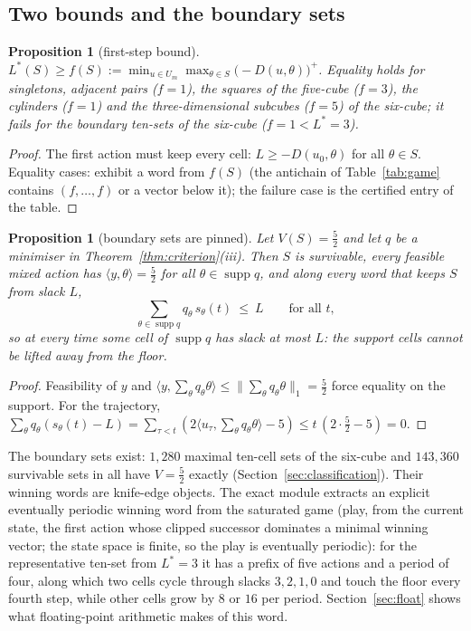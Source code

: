 \documentclass[11pt,a4paper]{article}
\theoremstyle{plain}
\newtheorem{proposition}[theorem]{Proposition}
\theoremstyle{definition}
\theoremstyle{remark}
\newcommand{\supp}{\operatorname{supp}}
\newcommand{\tfr}[2]{\tfrac{#1}{#2}}
\newcommand{\Lstar}{L^{\ast}}
\begin{document}
\subsection{Two bounds and the boundary sets}
\begin{proposition}[first-step bound]\label{prop:firststep}
$\Lstar(S)\ge f(S):=\min_{u\in U_m}\max_{\theta\in S}\big(-D(u,\theta)\big)^+$. Equality holds for singletons, adjacent pairs ($f=1$), the squares of the five-cube ($f=3$), the cylinders ($f=1$) and the three-dimensional subcubes ($f=5$) of the six-cube; it fails for the boundary ten-sets of the six-cube ($f=1<\Lstar=3$).
\end{proposition}
\begin{proof}
The first action must keep every cell: $L\ge-D(u_0,\theta)$ for all $\theta\in S$. Equality cases: exhibit a word from $f(S)$ (the antichain of Table~\ref{tab:game} contains $(f,\dots,f)$ or a vector below it); the failure case is the certified entry of the table.
\end{proof}

\begin{proposition}[boundary sets are pinned]\label{prop:pinned}
Let $V(S)=\tfr52$ and let $q$ be a minimiser in Theorem~\ref{thm:criterion}(iii). Then $S$ is survivable, every feasible mixed action has $\langle y,\theta\rangle=\tfr52$ for all $\theta\in\supp q$, and along \emph{every} word that keeps $S$ from slack $L$,
\[\sum_{\theta\in\supp q}q_\theta\,s_\theta(t)\ \le\ L\qquad\text{for all }t,\]
so at every time some cell of $\supp q$ has slack at most $L$: the support cells cannot be lifted away from the floor.
\end{proposition}
\begin{proof}
Feasibility of $y$ and $\langle y,\sum_\theta q_\theta\theta\rangle\le\|\sum_\theta q_\theta\theta\|_1=\tfr52$ force equality on the support. For the trajectory, $\sum_\theta q_\theta(s_\theta(t)-L)=\sum_{\tau<t}(2\langle u_\tau,\sum_\theta q_\theta\theta\rangle-5)\le t\,(2\cdot\tfr52-5)=0$.
\end{proof}

The boundary sets exist: $1{,}280$ maximal ten-cell sets of the six-cube and $143{,}360$ survivable sets in all have $V=\tfr52$ exactly (Section~\ref{sec:classification}). Their winning words are knife-edge objects. The exact module extracts an explicit eventually periodic winning word from the saturated game (play, from the current state, the first action whose clipped successor dominates a minimal winning vector; the state space is finite, so the play is eventually periodic): for the representative ten-set from $\Lstar=3$ it has a prefix of five actions and a period of four, along which two cells cycle through slacks $3,2,1,0$ and touch the floor every fourth step, while other cells grow by $8$ or $16$ per period. Section~\ref{sec:float} shows what floating-point arithmetic makes of this word.
\end{document}
